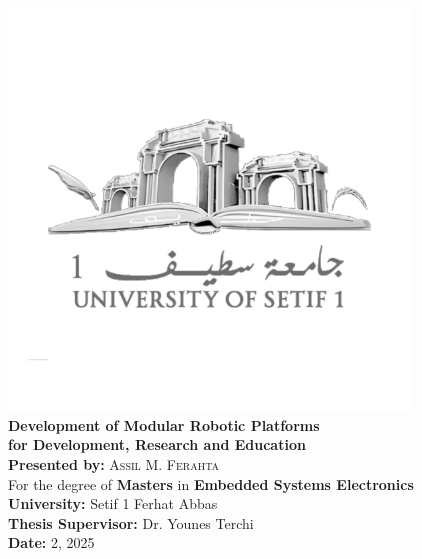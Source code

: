 \documentclass[12pt,a4paper]{scrreport}
\begin{document}
\begin{titlepage}
    \centering
    \includegraphics[width=0.8\textwidth]{Figures/LOGO-UFAS1-2020.png} %
    \\
    {\LARGE \textbf{Development of Modular Robotic Platforms}}\\[1cm]
    {\Large \textbf{for Development, Research and Education}}\\[2cm]
    \textbf{Presented by:} \textsc{Assil M. Ferahta}\\
    For the degree of \textbf{Masters} in \textbf{Embedded Systems Electronics}\\[1cm]
    \textbf{University:} Setif 1 Ferhat Abbas\\
    \textbf{Thesis Supervisor:} Dr. Younes Terchi\\
    \textbf{Date:} 2, 2025\\[2cm]

    \vfill
\end{titlepage}




\tableofcontents
\newpage










\printbibliography
\end{document}
